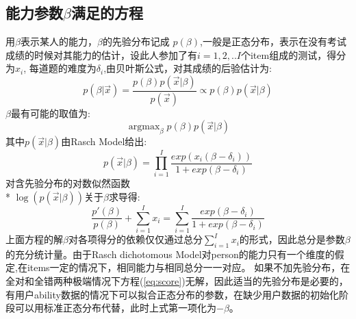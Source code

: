 \documentclass[12pt]{article}
\DeclareMathOperator*{\argmax}{argmax}
\begin{document}
\subsection{能力参数$\beta$满足的方程}\label{A3}
用$\beta$表示某人的能力，$\beta$的先验分布记成
$p(\beta)$,一般是正态分布，表示在没有考试成绩的时候对其能力的估计，设此人参加了有$i=1,2,..I$个item组成的测试，得分为$x_i$,
每道题的难度为$\delta_i$,由贝叶斯公式，对其成绩的后验估计为:
\begin{equation}
p(\beta|\vec{x})=\frac{p(\beta)p(\vec{x}|\beta)}{p(\vec{x})}\propto p(\beta)p(\vec{x}|\beta)
\end{equation}
$\beta$最有可能的取值为:
\begin{equation}\label{eq:map}
\argmax_{\beta} p(\beta)p(\vec{x}|\beta)
\end{equation}
其中$p(\vec{x}|\beta)$由Rasch Model给出:
\begin{equation}
p(\vec{x}|\beta)=\prod_{i=1}^I \frac{exp(x_i(\beta-\delta_i))}{1+exp(\beta-\delta_i)}
\end{equation}
对含先验分布的对数似然函数\\*
$\log(p(\vec{x}|\beta))$关于$\beta$求导得:
\begin{equation}\label{eq:score}
\frac{p'(\beta)}{p(\beta)}+\sum_{i=1}^I x_i =\sum_{i=1}^I \frac{exp(\beta-\delta_i)}{1+exp(\beta-\delta_i)}
\end{equation}
上面方程的解$\beta$对各项得分的依赖仅仅通过总分$\sum_{i=1}^I x_i$的形式，因此总分是参数$\beta$的充分统计量。由于Rasch  dichotomous Model对person的能力只有一个维度的假定,在items一定的情况下，相同能力与相同总分一一对应。
如果不加先验分布，在全对和全错两种极端情况下方程(\ref{eq:score})无解，因此适当的先验分布是必要的，有用户ability数据的情况下可以拟合正态分布的参数，在缺少用户数据的初始化阶段可以用标准正态分布代替，此时上式第一项化为$-\beta$。
\end{document}

